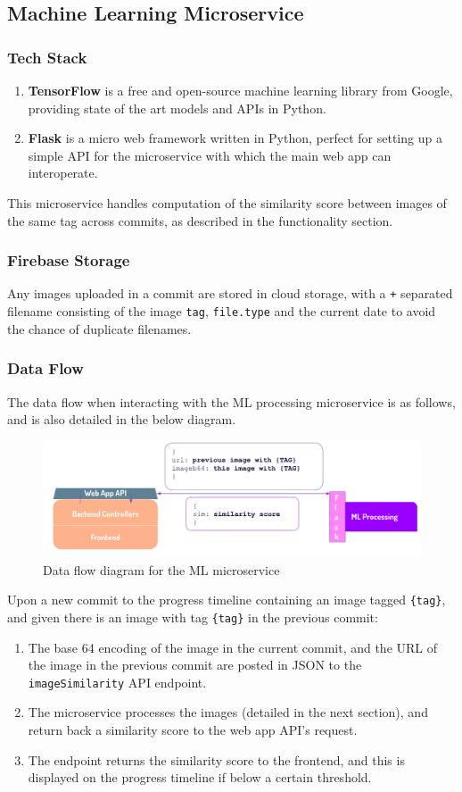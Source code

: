 \documentclass[12pt,a4paper]{article}
\begin{document}
\subsection{Machine Learning Microservice}
\subsubsection{Tech Stack}
\begin{enumerate}
    \item \textbf{TensorFlow} is a free and open-source machine learning library from Google, providing state of the art models and APIs in Python.
    \item \textbf{Flask} is a micro web framework written in Python, perfect for setting up a simple API for the microservice with which the main web app can interoperate. 
\end{enumerate}
This microservice handles computation of the similarity score between images of the same tag across commits, as described in the functionality section.
\subsubsection{Firebase Storage} Any images uploaded in a commit are stored in cloud storage, with a \verb|+| separated filename consisting of the image \verb|tag|, \verb|file.type| and the current date to avoid the chance of duplicate filenames.
\subsubsection{Data Flow} The data flow when interacting with the ML processing microservice is as follows, and is also detailed in the below diagram.
\begin{figure}[H]
    \centering
    \includegraphics[scale=0.6]{ml.png}
    \caption{Data flow diagram for the ML microservice}
\end{figure}
Upon a new commit to the progress timeline containing an image tagged \verb|{tag}|, and given there is an image with tag \verb|{tag}| in the previous commit:
\begin{enumerate}
    \item The base 64 encoding of the image in the current commit, and the URL of the image in the previous commit are posted in JSON to the \verb|imageSimilarity| API endpoint. 
    \item The microservice processes the images (detailed in the next section), and return back a similarity score to the web app API's request.
    \item The endpoint returns the similarity score to the frontend, and this is displayed on the progress timeline if below a certain threshold.
\end{enumerate}
\end{document}
